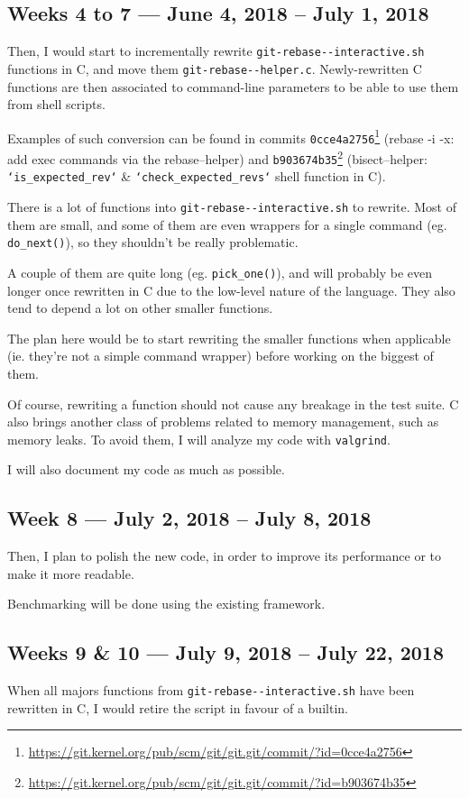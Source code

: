 \documentclass[11pt]{article}
\begin{document}
\subsection{Weeks 4 to 7 --- June 4, 2018 -- July 1, 2018}
\label{sec:org6ed7496}
Then, I would start to incrementally rewrite
\texttt{git-rebase-{}-interactive.sh} functions in C, and move them
\texttt{git-rebase-{}-helper.c}. Newly-rewritten C functions are then
associated to command-line parameters to be able to use them from
shell scripts.

Examples of such conversion can be found in commits
\texttt{0cce4a2756}\footnote{\url{https://git.kernel.org/pub/scm/git/git.git/commit/?id=0cce4a2756}} (rebase -i -x: add exec commands via the
rebase--helper) and \texttt{b903674b35}\footnote{\url{https://git.kernel.org/pub/scm/git/git.git/commit/?id=b903674b35}} (bisect--helper:
\texttt{`is\_expected\_rev`} \& \texttt{`check\_expected\_revs`} shell function in C).

There is a lot of functions into \texttt{git-rebase-{}-interactive.sh} to
rewrite. Most of them are small, and some of them are even wrappers
for a single command (eg. \texttt{do\_next()}), so they shouldn’t be really
problematic.

A couple of them are quite long (eg. \texttt{pick\_one()}), and will probably
be even longer once rewritten in C due to the low-level nature of the
language. They also tend to depend a lot on other smaller functions.

The plan here would be to start rewriting the smaller functions when
applicable (ie. they’re not a simple command wrapper) before
working on the biggest of them.

Of course, rewriting a function should not cause any breakage in the
test suite. C also brings another class of problems related to memory
management, such as memory leaks. To avoid them, I will analyze my
code with \texttt{valgrind}.

I will also document my code as much as possible.

\subsection{Week 8 --- July 2, 2018 -- July 8, 2018}
\label{sec:org29eeaba}
Then, I plan to polish the new code, in order to improve its
performance or to make it more readable.

Benchmarking will be done using the existing framework.

\subsection{Weeks 9 \& 10 --- July 9, 2018 -- July 22, 2018}
\label{sec:orgaaeed8c}
When all majors functions from \texttt{git-rebase-{}-interactive.sh} have been
rewritten in C, I would retire the script in favour of a builtin.
\end{document}
